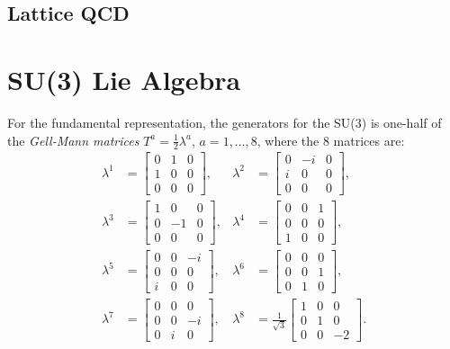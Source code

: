 \subsection{Lattice QCD}



\section{SU(3) Lie Algebra}
For the fundamental representation, the generators for the SU(3) is one-half of the \textit{Gell-Mann matrices} $T^a = \frac{1}{2}\lambda^a$, $a=1,\dots,8$, where the 8 matrices are:
\begin{equation}
\begin{aligned}
	\lambda^1 &= \left[\begin{array}{ccc}
		0 & 1 & 0 \\ 1 & 0 & 0 \\ 0 & 0 & 0
	\end{array} \right], &
	\lambda^2 &= \left[\begin{array}{ccc}
		0 & -i & 0 \\ i & 0 & 0 \\ 0 & 0 & 0
	\end{array} \right], \\
	\lambda^3 &= \left[\begin{array}{ccc}
		1 & 0 & 0 \\ 0 & -1 & 0 \\ 0 & 0 & 0
	\end{array} \right], &
	\lambda^4 &= \left[\begin{array}{ccc}
		0 & 0 & 1 \\ 0 & 0 & 0 \\ 1 & 0 & 0
	\end{array} \right], \\
	\lambda^5 &= \left[\begin{array}{ccc}
		0 & 0 & -i \\ 0 & 0 & 0 \\ i & 0 & 0
	\end{array} \right], &
	\lambda^6 &= \left[\begin{array}{ccc}
		0 & 0 & 0 \\ 0 & 0 & 1 \\ 0 & 1 & 0
	\end{array} \right], \\
	\lambda^7 &= \left[\begin{array}{ccc}
		0 & 0 & 0 \\ 0 & 0 & -i \\ 0 & i & 0
	\end{array} \right], &
	\lambda^8 &= \frac{1}{\sqrt{3}}\left[\begin{array}{ccc}
		1 & 0 & 0 \\ 0 & 1 & 0 \\ 0 & 0 & -2
	\end{array} \right].
\end{aligned}
\end{equation}
